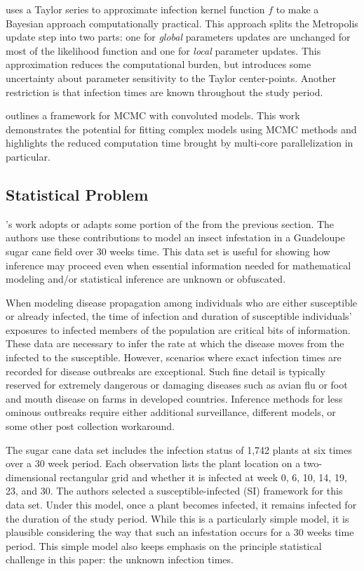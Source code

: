 \documentclass{uwstat572}
\begin{document}
\cite{Deardon} uses a Taylor series to approximate infection kernel function $f$ to make a Bayesian approach computationally practical. 
This approach splits the Metropolis update step into two parts: one for \textit{global} parameters updates are unchanged for most of the likelihood function and one for \textit{local} parameter updates. 
This approximation reduces the computational burden, but introduces some uncertainty about parameter sensitivity to the Taylor center-points. 
Another restriction is that infection times are known throughout the study period. 

\cite{Jewell} outlines a framework for MCMC with convoluted models.
This work demonstrates the potential for fitting complex models using MCMC methods and highlights the reduced computation time brought by multi-core parallelization in particular.  

\subsection{Statistical Problem}

\cite{Brown}'s work adopts or adapts some portion of the from the previous section.
The authors use these contributions to model an insect infestation in a Guadeloupe sugar cane field over 30 weeks time. 
This data set is useful for showing how inference may proceed even when essential information needed for mathematical modeling and/or statistical inference are unknown or obfuscated. 

When modeling disease propagation among individuals who are either susceptible or already infected, the time of infection and duration of susceptible individuals' exposures to infected members of the population are critical bits of information. 
These data are necessary to infer the rate at which the disease moves from the infected to the susceptible. 
However, scenarios where exact infection times are recorded for disease outbreaks are exceptional. 
Such fine detail is typically reserved for extremely dangerous or damaging diseases such as avian flu or foot and mouth disease on farms in developed countries. 
Inference methods for less ominous outbreaks require either additional surveillance, different models, or some other post collection workaround. 

The sugar cane data set includes the infection status of 1,742 plants at six times over a 30 week period. 
Each observation lists the plant location on a two-dimensional rectangular grid and whether it is infected at week 0, 6, 10, 14, 19, 23, and 30.
The authors selected a susceptible-infected (SI) framework for this data set. 
Under this model, once a plant becomes infected, it remains infected for the duration of the study period. 
While this is a particularly simple model, it is plausible considering the way that such an infestation occurs for a 30 weeks time period. 
This simple model also keeps emphasis on the principle statistical challenge in this paper: the unknown infection times. 
\end{document}
